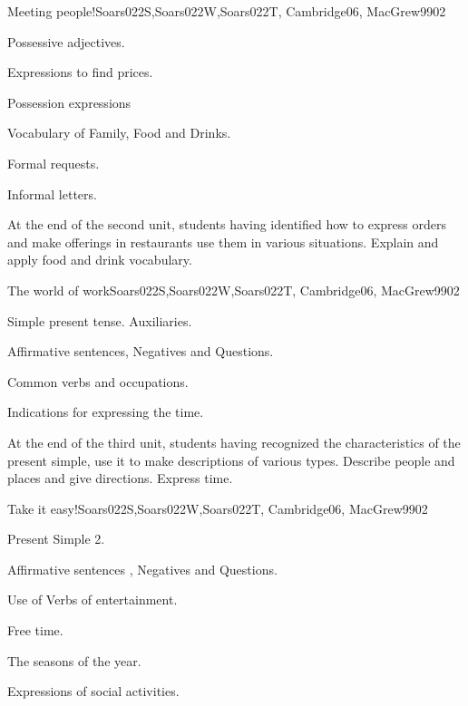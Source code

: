\begin{syllabus}
\begin{unit}{Meeting people!}{}{Soars022S,Soars022W,Soars022T, Cambridge06, MacGrew99}{0}{2}
   \begin{topics}
      \item Possessive adjectives.
      \item Expressions to find prices.
      \item Possession expressions
      \item Vocabulary of Family, Food and Drinks.
      \item Formal requests.
      \item Informal letters.
   \end{topics}

   \begin{learningoutcomes}
      \item At the end of the second unit, students having identified how to express orders and make offerings in restaurants use them in various situations. Explain and apply food and drink vocabulary.
   \end{learningoutcomes}

\end{unit}

\begin{unit}{The world of work}{}{Soars022S,Soars022W,Soars022T, Cambridge06, MacGrew99}{0}{2}
   \begin{topics}
      \item Simple present tense. Auxiliaries.
      \item Affirmative sentences, Negatives and Questions.
      \item Common verbs and occupations.
      \item Indications for expressing the time.
   \end{topics}

   \begin{learningoutcomes}
      \item At the end of the third unit, students having recognized the characteristics of the present simple, use it to make descriptions of various types. Describe people and places and give directions. Express time.
   \end{learningoutcomes}

\end{unit}

\begin{unit}{Take it easy!}{}{Soars022S,Soars022W,Soars022T, Cambridge06, MacGrew99}{0}{2}
   \begin{topics}
      \item Present Simple 2.
      \item Affirmative sentences , Negatives and Questions.
      \item Use of Verbs of entertainment.
      \item Free time.
      \item The seasons of the year.
      \item Expressions of social activities.
   \end{topics}


\end{unit}
\end{syllabus}
